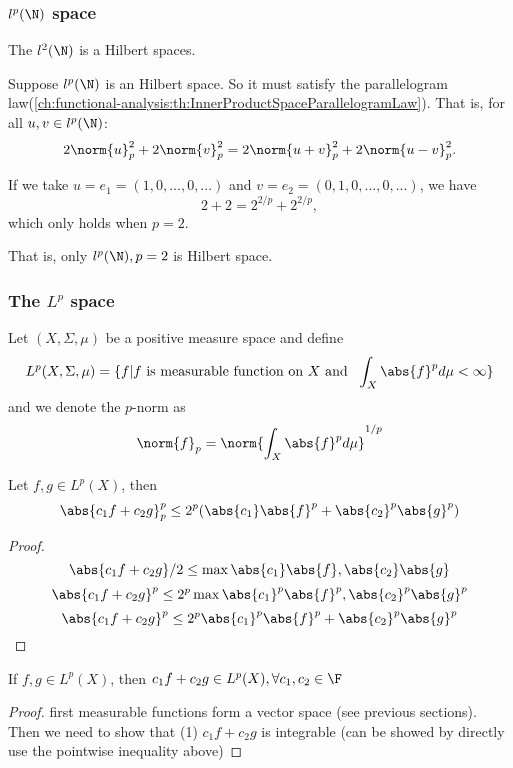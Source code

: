 \begin{refsection}
\subsubsection{$l^p(\N)$ space}

\begin{theorem}\cite[65]{christensen2010functions}
	The $l^2(\N)$ is a Hilbert spaces. 
\end{theorem}


\begin{note}
	Suppose $l^p(\N)$ is an Hilbert space. So it must satisfy the parallelogram law(\autoref{ch:functional-analysis:th:InnerProductSpaceParallelogramLaw}). That is, for all $u,v \in l^p(\N)$:
	$$2\norm{u}_p^2 + 2\norm{v}_p^2 = 2\norm{u+v}_p^2 + 2\norm{u-v}_p^2.$$
	
	If we take $u = e_1 = (1,0,...,0,...)$ and $v = e_2 = (0,1,0,...,0,...)$, we have
	$$2 + 2 = 2^{2/p} + 2^{2/p},$$
	which only holds when $p=2$. 
	
	That is, only $l^p(\N),p=2$ is Hilbert space.	
\end{note}




\subsubsection{The $L^p$ space}
\begin{definition}[$L^p$ space] 
	\cite{wiki:Lpspace} Let $(X,\Sigma,\mu)$ be a positive measure space and define $$L^p(X,\Sigma,\mu)=\{f|f ~ \text{is measurable function on $X$ and } ~ \int_X \abs{f}^p d\mu < \infty\}$$
	and we denote the $p$-norm as
	$$\norm{f}_p = \norm{\int_X \abs{f}^p d\mu}^{1/p}$$
\end{definition}


\begin{lemma}
	\cite{wiki:Lpspace}\cite[32]{sansone2004orthogonal} Let $f,g\in L^p(X)$, then
	$$\abs{c_1f+c_2g}_p^p \leq 2^{p}(\abs{c_1}\abs{f}^p + \abs{c_2}^p\abs{g}^p)$$
\end{lemma}
\begin{proof}
	$$\abs{c_1 f + c_2 g}/2 \leq \max{\abs{c_1}\abs{f},\abs{c_2}\abs{g}} $$
	$$\abs{c_1 f + c_2 g}^p \leq 2^p\max{\abs{c_1}^p\abs{f}^p,\abs{c_2}^p\abs{g}^p} $$
	$$\abs{c_1 f + c_2 g}^p \leq 2^p\abs{c_1}^p\abs{f}^p+\abs{c_2}^p\abs{g}^p $$
	
\end{proof}
\begin{lemma}
	If $f,g \in L^p(X)$, then $c_1f+c_2g \in L^p(X), \forall c_1,c_2 \in \F$	
\end{lemma}
\begin{proof}
	first measurable functions form a vector space (see previous sections). Then we need to show that (1) $c_1f + c_2g$ is integrable (can be showed by directly use the pointwise inequality above)	
\end{proof}



\end{refsection}
